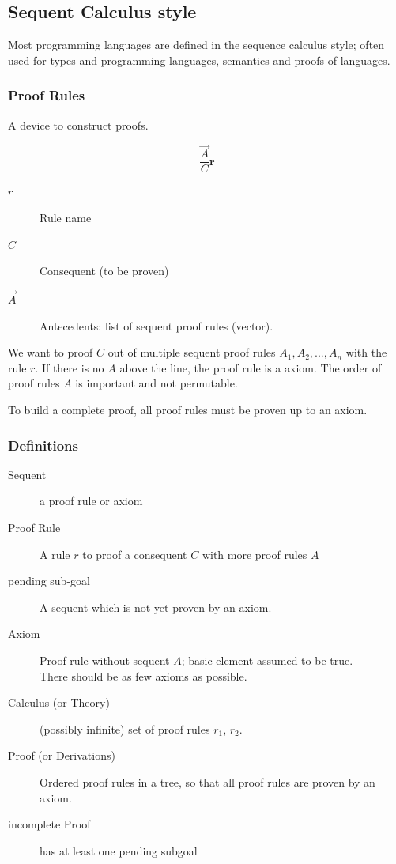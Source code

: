 \subsection{Sequent Calculus style}

Most programming languages are defined in the sequence calculus style; often used for types and programming languages, semantics and proofs of languages.


\subsubsection{Proof Rules}

 A device to construct proofs.
 
 \[
 \frac{\overrightarrow{A}}{C} \boldsymbol{r}
 \]
 
 \begin{description}
	 	\item[$r$] Rule name
	 	\item[$C$] Consequent (to be proven)
	 	\item[$\vec{A}$] Antecedents: list of sequent proof rules (vector).
 	\end{description}
 	
 
 We want to proof $C$ out of multiple sequent proof rules $A_1, A_2, ..., A_n$ with the rule $r$. If there is no $A$ above the line, the proof rule is a axiom. The order of proof rules $A$ is important and not permutable.
 
 To build a complete proof, all proof rules must be proven up to an axiom.


\subsubsection{Definitions}

\begin{description}
	\item[Sequent] a proof rule or axiom
	\item[Proof Rule] A rule $r$ to proof a consequent $C$ with more proof rules $A$
	\item[pending sub-goal] A sequent which is not yet proven by an axiom.
	\item[Axiom] Proof rule without sequent $A$; basic element assumed to be true. \\
	There should be as few axioms as possible.
	\item[Calculus (or Theory)] (possibly infinite) set of proof rules $r_1$, $r_2$.
	\item[Proof (or Derivations)] Ordered proof rules in a tree, so that all proof rules are proven by an axiom.
	\item[incomplete Proof] has at least one pending subgoal
\end{description}

